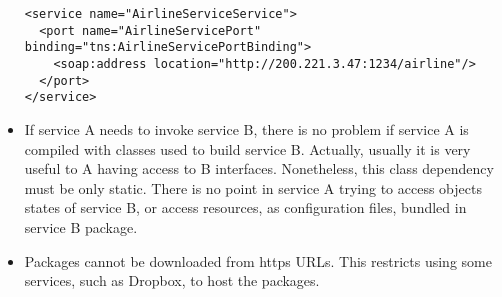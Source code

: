 \begin{itemize}
{\footnotesize
\begin{lstlisting}[caption=Good example of service port address on a WSDL file, 
label=lst:wsdl_address] 
<service name="AirlineServiceService">
  <port name="AirlineServicePort" binding="tns:AirlineServicePortBinding">
    <soap:address location="http://200.221.3.47:1234/airline"/>
  </port>
</service>
\end{lstlisting}
}

\item If service A needs to invoke service B, there is no problem if service A is compiled with classes used to build service B. Actually, usually it is very useful to A having access to B interfaces. Nonetheless, this class dependency must be only static. There is no point in service A trying to access objects states of service B, or access resources, as configuration files, bundled in service B package.

\item Packages cannot be downloaded from https URLs. This restricts using some services, such as Dropbox, to host the packages.

\end{itemize}

